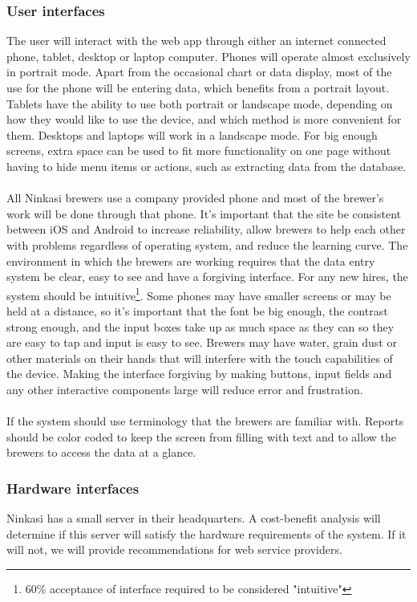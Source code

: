 \documentclass[draftclsnofoot,onecolumn,letterpaper,10pt,compsoc]{IEEEtran}
\begin{document}
		\subsubsection{User interfaces}
        The user will interact with the web app through either an internet connected phone, tablet, desktop or laptop computer. Phones will operate almost exclusively in portrait mode. Apart from the occasional chart or data display, most of the use for the phone will be entering data, which benefits from a portrait layout. Tablets have the ability to use both portrait or landscape mode, depending on how they would like to use the device, and which method is more convenient for them. Desktops and laptops will work in a landscape mode. For big enough screens, extra space can be used to fit more functionality on one page without having to hide menu items or actions, such as extracting data from the database.
        \\
        \\
        All Ninkasi brewers use a company provided phone and most of the brewer's work will be done through that phone. It's important that the site be consistent between iOS and Android to increase reliability, allow brewers to help each other with problems regardless of operating system, and reduce the learning curve. The environment in which the brewers are working requires that the data entry system be clear, easy to see and have a forgiving interface. For any new hires, the system should be intuitive\footnote{60\% acceptance of interface required to be considered "intuitive"}. Some phones may have smaller screens or may be held at a distance, so it's important that the font be big enough, the contrast strong enough, and the input boxes take up as much space as they can so they are easy to tap and input is easy to see. Brewers may have water, grain dust or other materials on their hands that will interfere with the touch capabilities of the device. Making the interface forgiving by making buttons, input fields and any other interactive components large will reduce error and frustration.
        \\
        \\
        If the system should use terminology that the brewers are familiar with. Reports should be color coded to keep the screen from filling with text and to allow the brewers to access the data at a glance.
        
		\subsubsection{Hardware interfaces}
        Ninkasi has a small server in their headquarters. A cost-benefit analysis will determine if this server will satisfy the hardware requirements of the system. If it will not, we will provide recommendations for web service providers.
        
\end{document}
